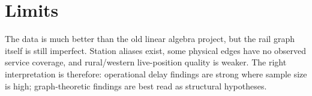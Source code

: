 \documentclass[11pt,a4paper]{article}
\begin{document}
\section{Limits}

The data is much better than the old linear algebra project, but the rail graph itself is still imperfect. Station aliases exist, some physical edges have no observed service coverage, and rural/western live-position quality is weaker. The right interpretation is therefore: operational delay findings are strong where sample size is high; graph-theoretic findings are best read as structural hypotheses.
\end{document}

